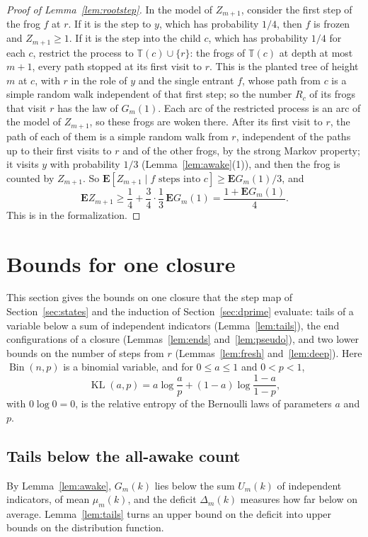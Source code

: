 \documentclass[11pt]{amsart}
\theoremstyle{definition}
\numberwithin{equation}{section}
\newcommand{\T}{\mathbb{T}}
\newcommand{\E}{\mathbf{E}}
\newcommand{\Bin}{\operatorname{Bin}}
\newcommand{\KL}{\operatorname{KL}}
\begin{document}
\begin{proof}[Proof of Lemma~\ref{lem:rootstep}]
In the model of $Z_{m+1}$, consider the first step of the frog $f$ at $r$. If it is the step to $y$, which has probability $1/4$, then $f$ is frozen and $Z_{m+1}\ge1$. If it is the step into the child $c$, which has probability $1/4$ for each $c$, restrict the process to $\T(c)\cup\{r\}$: the frogs of $\T(c)$ at depth at most $m+1$, every path stopped at its first visit to $r$. This is the planted tree of height $m$ at $c$, with $r$ in the role of $y$ and the single entrant $f$, whose path from $c$ is a simple random walk independent of that first step; so the number $R_c$ of its frogs that visit $r$ has the law of $G_m(1)$. Each arc of the restricted process is an arc of the model of $Z_{m+1}$, so these frogs are woken there. After its first visit to $r$, the path of each of them is a simple random walk from $r$, independent of the paths up to their first visits to $r$ and of the other frogs, by the strong Markov property; it visits $y$ with probability $1/3$ (Lemma~\ref{lem:awake}(1)), and then the frog is counted by $Z_{m+1}$. So $\E[Z_{m+1}\mid f\text{ steps into }c]\ge\E G_m(1)/3$, and
\[
\E Z_{m+1}\ge\frac14+\frac34\cdot\frac13\,\E G_m(1)=\frac{1+\E G_m(1)}4.
\]
This is  in the formalization.
\end{proof}

\section{Bounds for one closure}\label{sec:onebounds}

This section gives the bounds on one closure that the step map of Section~\ref{sec:states} and the induction of Section~\ref{sec:dprime} evaluate: tails of a variable below a sum of independent indicators (Lemma~\ref{lem:tails}), the end configurations of a closure (Lemmas~\ref{lem:ends} and~\ref{lem:pseudo}), and two lower bounds on the number of steps from $r$ (Lemmas~\ref{lem:fresh} and~\ref{lem:deep}). Here $\Bin(n,p)$ is a binomial variable, and for $0\le a\le1$ and $0<p<1$,
\[
\KL(a,p)=a\log\frac ap+(1-a)\log\frac{1-a}{1-p},
\]
with $0\log0=0$, is the relative entropy of the Bernoulli laws of parameters $a$ and $p$.

\subsection*{Tails below the all-awake count}
By Lemma~\ref{lem:awake}, $G_m(k)$ lies below the sum $U_m(k)$ of independent indicators, of mean $\mu_m(k)$, and the deficit $\Delta_m(k)$ measures how far below on average. Lemma~\ref{lem:tails} turns an upper bound on the deficit into upper bounds on the distribution function.
\end{document}
